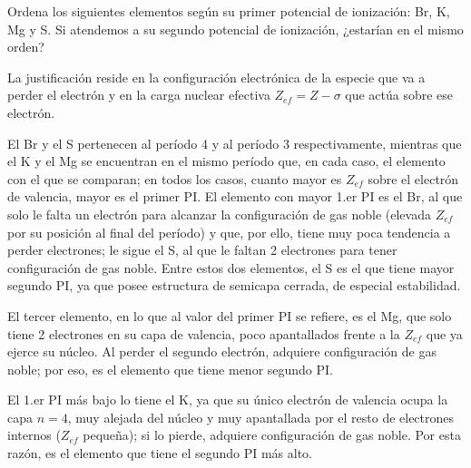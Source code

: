 \begin{question}
    Ordena los siguientes elementos según su primer potencial
    de ionización: Br, K, Mg y S. Si atendemos a su segundo potencial de ionización, ¿estarían en el mismo orden?


    \begin{solu}

%

        La justificación reside en la configuración electrónica de la
        especie que va a perder el electrón y en la carga nuclear
        efectiva \(Z_{ef} = Z - \sigma\) que actúa sobre ese electrón.

        El Br y el S pertenecen al período 4 y al período 3
        respectivamente, mientras que el K y el Mg se encuentran en el
        mismo período que, en cada caso, el elemento con el que se
        comparan; en todos los casos, cuanto mayor es \(Z_{ef}\) sobre
        el electrón de valencia, mayor es el primer PI.
        El elemento con mayor 1.er PI es el Br, al que solo le falta un
        electrón para alcanzar la configuración de gas noble (elevada
        \(Z_{ef}\) por su posición al final del período) y que,
        por ello, tiene muy poca tendencia a perder electrones; le
        sigue el S, al que le faltan 2 electrones para tener configuración
        de gas noble. Entre estos dos elementos, el S es el que
        tiene mayor segundo PI, ya que posee estructura de semicapa
        cerrada, de especial estabilidad.

        El tercer elemento, en lo que al valor del primer PI se refiere,
        es el Mg, que solo tiene 2 electrones en su capa de valencia,
        poco apantallados frente a la \(Z_{ef}\) que ya ejerce su núcleo.
        Al perder el segundo electrón, adquiere configuración de gas
        noble; por eso, es el elemento que tiene menor segundo PI.

        El 1.er PI más bajo lo tiene el K, ya que su único electrón de
        valencia ocupa la capa \(n=4\), muy alejada del núcleo y muy
        apantallada por el resto de electrones internos (\(Z_{ef}\)
        pequeña); si lo pierde, adquiere configuración de gas noble.
        Por esta razón, es el elemento que
        tiene el segundo PI más alto.
    \end{solu}

\end{question}

